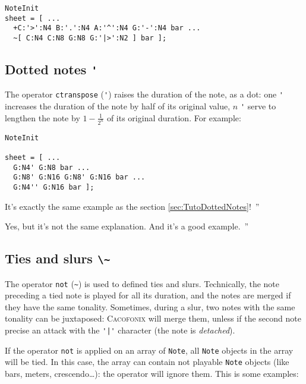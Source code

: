 \documentclass{article}
\newcommand{\cacofonix}{\textsc{Cacofonix}\xspace}
\newcommand{\note}{\lstinline!Note!\xspace}
\newenvironment{meenv}{ \par \noindent \makebox[6em][r]{ \textcolor{mecolor}{Me}: `` --~}}{~''}
\newenvironment{myselfenv}{ \par \noindent \makebox[6em][r]{ \textcolor{myselfcolor}{Myself}: `` --~}}{~''}
\newcommand{\me}[1]{\begin{meenv}#1\end{meenv}}
\newcommand{\myself}[1]{\begin{myselfenv}#1\end{myselfenv}}
\begin{document}
\begin{lstlisting}
NoteInit
sheet = [ ...
  +C:'>':N4 B:'.':N4 A:'^':N4 G:'-':N4 bar ...
  ~[ C:N4 C:N8 G:N8 G:'|>':N2 ] bar ];
\end{lstlisting}

\subsection{Dotted notes \lstinline!'!}
\label{sec:DottedNotes}

The operator \lstinline!ctranspose! (\lstinline!'!) raises the duration of the note, as a dot: one \lstinline!'! increases the duration of the note by half of its original value, $n$ \lstinline!'! serve to lengthen the note by $1 - \frac{1}{2^n}$ of its original duration. For example: \\

\begin{lstlisting}
NoteInit

sheet = [ ...
  G:N4' G:N8 bar ...
  G:N8' G:N16 G:N8' G:N16 bar ...
  G:N4'' G:N16 bar ];
\end{lstlisting}

\me{It's exactly the same example as the section \ref{sec:TutoDottedNotes}!}
\myself{Yes, but it's not the same explanation. And it's a good example.}

\subsection{Ties and slurs \lstinline!\~!}
\label{sec:TiesAndSlurs}

The operator \lstinline!not! (\lstinline!~!) is used to defined ties and slurs. Technically, the note preceding a tied note is played for all its duration, and the notes are merged if they have the same tonality. Sometimes, during a slur, two notes with the same tonality can be juxtaposed: \cacofonix will merge them, unless if the second note precise an attack with the \lstinline!'|'! character (the note is \emph{detached}).

If the operator \lstinline!not! is applied on an array of \note, all \note objects in the array will be tied. In this case, the array can contain not playable \note objects (like bars, meters, crescendo\dots): the operator will ignore them. This is some examples: \\
\end{document}

